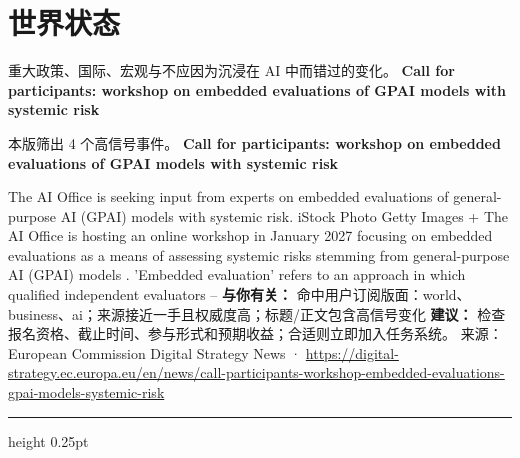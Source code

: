 \documentclass[10.5pt]{ctexart}
\begin{document}
\section*{世界状态}
{\color{ormuted} 重大政策、国际、宏观与不应因为沉浸在 AI 中而错过的变化。}
\vspace{2mm}
{\LARGE\bfseries Call for participants: workshop on embedded evaluations of GPAI models with systemic risk}\par
\vspace{1mm}
{\color{ormuted} 本版筛出 4 个高信号事件。}
\vspace{3mm}
{\Large\bfseries Call for participants: workshop on embedded evaluations of GPAI models with systemic risk}\par
The AI Office is seeking input from experts on embedded evaluations of general-purpose AI (GPAI) models with systemic risk. iStock Photo Getty Images + The AI Office is hosting an online workshop in January 2027 focusing on embedded evaluations as a means of assessing systemic risks stemming from general-purpose AI (GPAI) models . 'Embedded evaluation' refers to an approach in which qualified independent evaluators –
\textbf{与你有关：} 命中用户订阅版面：world、business、ai；来源接近一手且权威度高；标题/正文包含高信号变化
\textbf{建议：} 检查报名资格、截止时间、参与形式和预期收益；合适则立即加入任务系统。
{\footnotesize\color{ormuted} 来源：European Commission Digital Strategy News · \url{https://digital-strategy.ec.europa.eu/en/news/call-participants-workshop-embedded-evaluations-gpai-models-systemic-risk}}
\vspace{4mm}
\hrule height 0.25pt
\vspace{3mm}
\end{document}
